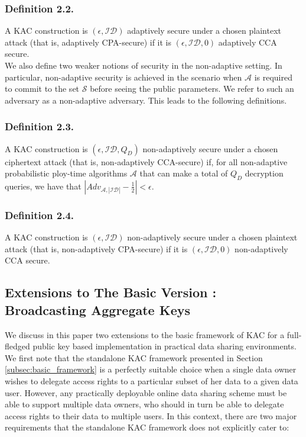 \subsubsection{Definition 2.2.}
 A KAC construction is $(\epsilon,\mathcal{ID})$ adaptively secure under a chosen plaintext attack (that is, adaptively CPA-secure) if it is $(\epsilon,\mathcal{ID},0)$ adaptively CCA secure.\\


\noindent We also define two weaker notions of security in the non-adaptive setting. In particular, non-adaptive security is achieved in the scenario when $\mathcal{A}$ is required to commit to the set $\mathcal{S}$ before seeing the public parameters. We refer to such an adversary as a non-adaptive adversary. This leads to the following definitions.

\subsubsection{Definition 2.3.}
 A KAC construction is $(\epsilon,\mathcal{ID},Q_D)$ non-adaptively secure under a chosen ciphertext attack (that is, non-adaptively CCA-secure) if, for all non-adaptive probabilistic ploy-time algorithms $\mathcal{A}$ that can make a total of $Q_D$ decryption queries, we have that $|Adv_{\mathcal{A},|\mathcal{ID}|}-\frac{1}{2}| < \epsilon$.

\subsubsection{Definition 2.4.}
 A KAC construction is $(\epsilon,\mathcal{ID})$ non-adaptively secure under a chosen plaintext attack (that is, non-adaptively CPA-secure) if it is $(\epsilon,\mathcal{ID},0)$ non-adaptively CCA secure.

\subsection{Extensions to The Basic Version : Broadcasting Aggregate Keys}
\label{subsec:extensions}

We discuss in this paper two extensions to the basic framework of KAC for a full-fledged public key based implementation in practical data sharing environments. We first note that the standalone KAC framework presented in Section \ref{subsec:basic_framework} is a perfectly suitable choice when a single data owner wishes to delegate access rights to a particular subset of her data to a given data user. However, any practically deployable online data sharing scheme must be able to support multiple data owners, who should in turn be able to delegate access rights to their data to multiple users. In this context, there are two major requirements that the standalone KAC framework does not explicitly cater to:

